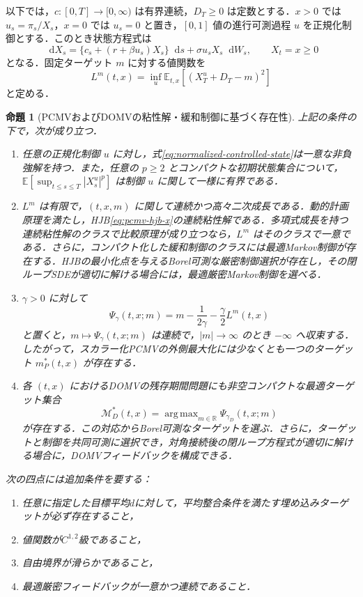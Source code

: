 \documentclass[10pt,a4paper]{article}
\theoremstyle{plain}
\newtheorem{proposition}{命題}
\theoremstyle{definition}
\newcommand{\E}{\mathbb{E}}
\DeclareMathOperator*{\argmax}{arg\,max}
\newcommand{\dd}{\mathop{}\!\mathrm{d}}
\begin{document}
以下では，$c:[0,T]\to[0,\infty)$ は有界連続，$D_T\geq0$ は定数とする．$x>0$ では $u_s=\pi_s/X_s$，$x=0$ では $u_s=0$ と置き，$[0,1]$ 値の進行可測過程 $u$ を正規化制御とする．このとき状態方程式は
\begin{equation}
 \dd X_s=\{c_s+(r+\beta u_s)X_s\}\dd s+\sigma u_sX_s\dd W_s,
 \qquad X_t=x\geq0
 \label{eq:normalized-controlled-state}
\end{equation}
となる．固定ターゲット $m$ に対する値関数を
\begin{equation}
 L^m(t,x)=\inf_{u}\E_{t,x}\!\left[(X_T^u+D_T-m)^2\right]
 \label{eq:app-weak-value}
\end{equation}
と定める．

\begin{proposition}[PCMVおよびDOMVの粘性解・緩和制御に基づく存在性]
\label{prop:weak-existence-pcmv-domv}
上記の条件の下で，次が成り立つ．
\begin{enumerate}[label=(\roman*),leftmargin=2.2em]
 \item 任意の正規化制御 $u$ に対し，式\eqref{eq:normalized-controlled-state}は一意な非負強解を持つ．また，任意の $p\geq2$ とコンパクトな初期状態集合について，$\E[\sup_{t\leq s\leq T}|X_s^u|^p]$ は制御 $u$ に関して一様に有界である．
 \item $L^m$ は有限で，$(t,x,m)$ に関して連続かつ高々二次成長である．動的計画原理を満たし，HJB\eqref{eq:pcmv-hjb-x}の連続粘性解である．多項式成長を持つ連続粘性解のクラスで比較原理が成り立つなら，$L^m$ はそのクラスで一意である．さらに，コンパクト化した緩和制御のクラスには最適Markov制御が存在する．HJBの最小化点を与えるBorel可測な厳密制御選択が存在し，その閉ループSDEが適切に解ける場合には，最適厳密Markov制御を選べる．
 \item $\gamma>0$ に対して
 \begin{equation}
  \Psi_\gamma(t,x;m)
  =m-\frac{1}{2\gamma}-\frac{\gamma}{2}L^m(t,x)
  \label{eq:app-scalarized-envelope}
 \end{equation}
 と置くと，$m\mapsto\Psi_\gamma(t,x;m)$ は連続で，$|m|\to\infty$ のとき $-\infty$ へ収束する．したがって，スカラー化PCMVの外側最大化には少なくとも一つのターゲット $m_P^*(t,x)$ が存在する．
 \item 各 $(t,x)$ におけるDOMVの残存期間問題にも非空コンパクトな最適ターゲット集合
 \[
   \mathcal M_D^*(t,x)=\argmax_{m\in\mathbb R}\Psi_{\gamma_D}(t,x;m)
 \]
 が存在する．この対応からBorel可測なターゲットを選ぶ．さらに，ターゲットと制御を共同可測に選択でき，対角接続後の閉ループ方程式が適切に解ける場合に，DOMVフィードバックを構成できる．
\end{enumerate}
次の四点には追加条件を要する：
\begin{enumerate}[label=(\alph*),leftmargin=2.2em,noitemsep,topsep=2pt]
 \item 任意に指定した目標平均$d$に対して，平均整合条件を満たす埋め込みターゲットが必ず存在すること，
 \item 値関数が$C^{1,2}$級であること，
 \item 自由境界が滑らかであること，
 \item 最適厳密フィードバックが一意かつ連続であること．
\end{enumerate}
\end{proposition}
\end{document}
